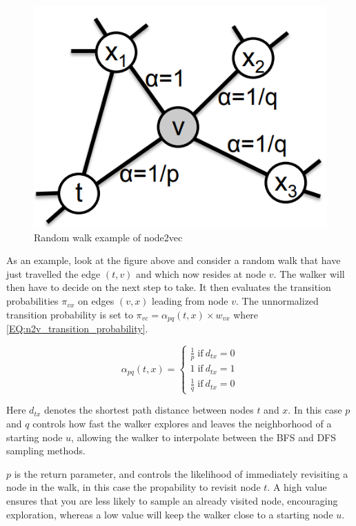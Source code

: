 \begin{figure}[H]
\centering
  \includegraphics[scale=0.5]{Article/figures/randomwalkexample.png}
  \caption{Random walk example of node2vec \cite{Node2vec}}
  \label{fig:n2v_randomwalk}
\end{figure}

As an example, look at the figure above and consider a random walk that have just travelled the edge $(t, v)$ and which now resides at node $v$. The walker will then have to decide on the next step to take. It then evaluates the transition probabilities $\pi_{vx}$ on edges $(v,x)$ leading from node $v$. The unnormalized transition probability is set to $\pi_{vc} = \alpha_{pq} (t,x) \times w_{vx}$ where \autoref{EQ:n2v_transition_probability}.

\begin{equation}\label{EQ:n2v_transition_probability}
\alpha_{pq} (t,x) =
\begin{cases} 
	\frac{1}{p} \; \text{if} \:  d_{tx} = 0 \\
	1 \; \text{if} \: d_{tx} = 1 \\
	\frac{1}{q} \; \text{if} \: d_{tx} = 0
\end{cases}
\end{equation}


Here $d_{tx}$ denotes the shortest path distance between nodes $t$ and $x$. In this case $p$ and $q$ controls how fast the walker explores and leaves the neighborhood of a starting node $u$, allowing the walker to interpolate between the BFS and DFS sampling methods.

$p$ is the return parameter, and controls the likelihood of immediately revisiting a node in the walk, in this case the propability to revisit node $t$. A high value ensures that you are less likely to sample an already visited node, encouraging exploration, whereas a low value will keep the walker close to a starting node $u$.

